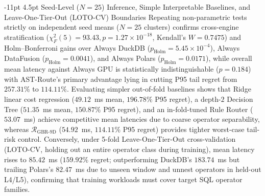 \documentclass[10pt,a4paper]{article}
\makeatletter
\renewcommand\subsubsection{\@startsection{subsubsection}{3}{\z@}%
  {-11pt \@plus -2.5pt \@minus -1pt}%
  {4.5pt \@plus 1pt}%
  {\normalfont\normalsize\bfseries}}
\makeatother
\begin{document}
\subsubsection{Seed-Level (\texorpdfstring{$N=25$}{N=25}) Inference, Simple Interpretable Baselines, and Leave-One-Tier-Out (LOTO-CV) Boundaries}
Repeating non-parametric tests strictly on independent seed means ($N=25$ clusters) confirms cross-engine stratification ($\chi^2_F(5)=93.43, p=1.27\times 10^{-18}$, Kendall's $W=0.7475$) and Holm--Bonferroni gains over Always DuckDB ($p_{\mathrm{Holm}}=5.45\times 10^{-4}$), Always DataFusion ($p_{\mathrm{Holm}}=0.0041$), and Always Polars ($p_{\mathrm{Holm}}=0.0171$), while overall mean latency against Always GPU is statistically indistinguishable ($p=0.184$) with AST-Route's primary advantage lying in cutting P95 tail regret from $257.31\%$ to $114.11\%$. Evaluating simpler out-of-fold baselines shows that Ridge linear cost regression ($49.12$~ms mean, $196.78\%$ P95 regret), a depth-$2$ Decision Tree ($51.35$~ms mean, $150.87\%$ P95 regret), and an in-fold-tuned Rule Router ($53.07$~ms) achieve competitive mean latencies due to coarse operator separability, whereas $\mathcal{R}_{\mathrm{GBR\mbox{-}9D}}$ ($54.92$~ms, $114.11\%$ P95 regret) provides tighter worst-case tail-risk control. Conversely, under 5-fold Leave-One-Tier-Out cross-validation (LOTO-CV, holding out an entire operator class during training), mean latency rises to $85.42$~ms ($159.92\%$ regret; outperforming DuckDB's $183.74$~ms but trailing Polars's $82.47$~ms due to unseen window and unnest operators in held-out L4/L5), confirming that training workloads must cover target SQL operator families.
\end{document}
